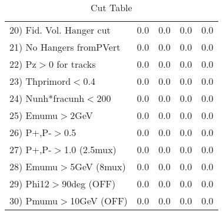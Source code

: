 \begin{table}[h!]
\begin{tabular}{||l||r|r|r|r||}
 20) Fid. Vol. Hanger cut &         0.0 &         0.0 &         0.0 &         0.0 \\
 21) No Hangers fromPVert &         0.0 &         0.0 &         0.0 &         0.0 \\
 22) Pz$>$0 for tracks    &         0.0 &         0.0 &         0.0 &         0.0 \\
 23) Thprimord$<$0.4      &         0.0 &         0.0 &         0.0 &         0.0 \\
 24) Nunh*fracunh$<$200   &         0.0 &         0.0 &         0.0 &         0.0 \\
 25) Emumu$>$2GeV         &         0.0 &         0.0 &         0.0 &         0.0 \\
 26) P+,P-$>$0.5          &         0.0 &         0.0 &         0.0 &         0.0 \\
 27) P+,P-$>$1.0 (2.5mux) &         0.0 &         0.0 &         0.0 &         0.0 \\
 28) Emumu$>$5GeV  (8mux) &         0.0 &         0.0 &         0.0 &         0.0 \\
 29) Phi12$>$90deg  (OFF) &         0.0 &         0.0 &         0.0 &         0.0 \\
 30) Pmumu$>$10GeV  (OFF) &         0.0 &         0.0 &         0.0 &         0.0 \\
 \hline
 \hline
 \end{tabular}
 \caption{Cut Table  }
 \label{tab-cut_c0pi0}
 \end{table}
